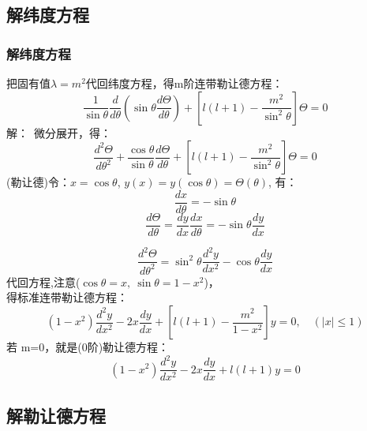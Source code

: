 \subsection{解纬度方程}
\begin{frame}
	\frametitle{解纬度方程}
	把固有值$\lambda=m^2$代回纬度方程，得m阶连带勒让德方程：
	\begin{equation*}
		\boxed{\frac{1}{\sin \theta} \frac{d}{d \theta}\left(\sin \theta \frac{d \Theta}{d \theta}\right)+\left[l(l+1)-\frac{m^{2}}{\sin ^{2} \theta}\right] \Theta=0}
	\end{equation*}	
	\alert{解：}~微分展开，得：
	\begin{equation*}
		\frac{d^{2} \Theta}{d \theta^{2}}+\frac{\cos \theta}{\sin \theta} \frac{d \Theta}{d \theta}+\left[l(l+1)-\frac{m^{2}}{\sin ^{2} \theta}\right] \Theta=0
	\end{equation*}		
	(勒让德)令：$x=\cos \theta$,  $y(x)= y(\cos \theta) =\Theta (\theta)$, 有：
	\begin{equation*}
		\frac{d x}{d  \theta} =-\sin \theta  
	\end{equation*}		
	\begin{equation*}
		\frac{d \Theta}{d \theta} =\frac{d y}{d x}\frac{d x}{d \theta} =-\sin \theta \frac{d y}{d x}
	\end{equation*}		
\end{frame}	

\begin{frame}
	\begin{equation*}
		\frac{ d^2 \Theta }{d \theta ^2} =\sin ^2 \theta \frac{d^2 y}{d x^2} -\cos \theta \frac{d y}{d x}
	\end{equation*}		
	代回方程,注意($\cos\theta =x,~ \sin  \theta =1-x^2 $)， \\
	得标准连带勒让德方程：
	\begin{equation*}
		\left(1-x^{2}\right) \frac{d^{2} y}{d x^{2}}-2 x \frac{d y}{d x}+\left[l(l+1)-\frac{m^{2}}{1-x^{2}}\right] y=0, \quad (|x|\le 1)
	\end{equation*}		
	若 m=0，就是(0阶)勒让德方程：
	\begin{equation*}
		\left(1-x^{2}\right) \frac{d^{2} y}{d x^{2}}-2 x \frac{d y}{d x}+l(l+1)y=0
	\end{equation*}		
\end{frame}	

\subsection{解勒让德方程}

